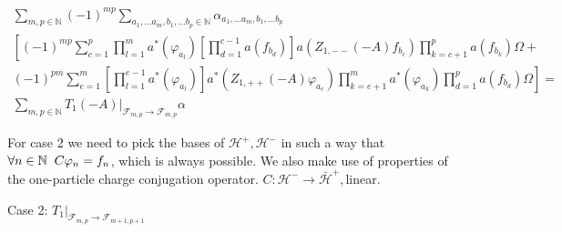 \documentclass[a4paper,12pt]{article}
\begin{document}
\begin{multline}
\sum_{m,p \in \mathbb{N}} (-1)^{m p} \sum_{a_1, \dots a_m, b_1, \dots b_p \in \mathbb{N}} \alpha_{a_1, \dots a_m, b_1, \dots b_p} \\
\left[ (-1)^{m p}\sum_{c=1}^p \prod_{l=1}^m a^*( \varphi_{a_l})  \left[\prod_{d=1}^{c-1} a( f_{b_d})\right]  a\left( Z_{1,--}(-A) f_{b_c}\right) \prod_{k=c+1}^{p} a( f_{b_k})   \Omega \right.
+\\
\left. (-1)^{p m}\sum_{e=1}^m    \left[ \prod_{l=1}^{e-1} a^*( \varphi_{a_l}) \right]  a^*\left( Z_{1,++}(-A)  \varphi_{a_e}\right)  \prod_{k=e+1}^{m} a^*( \varphi_{a_k}) \prod_{d=1}^{p} a( f_{b_d})\Omega \right] =\\
\sum_{m,p\in \mathbb{N}}\left. T_1(-A)\right|_{\mathcal{F}_{m,p}\rightarrow\mathcal{F}_{m,p}}  \alpha
\end{multline}

\newpage 

For case 2 we need to pick the bases of \(\mathcal{H}^+, \mathcal{H}^-\) in such a way that \(\forall n \in \mathbb{N} \hspace{0.2cm} C \varphi_n = f_n \), which is always possible. We also make use of properties of the one-particle charge conjugation operator. \(C: \mathcal{H}^- \rightarrow \bar{\mathcal{H}}^+, \)linear.
\begin{center}
{\large Case 2: \(\left. T_1\right|_{\mathcal{F}_{m,p}\rightarrow\mathcal{F}_{m+1,p+1}}\)}
\end{center}
\end{document}
